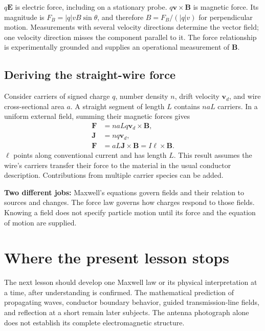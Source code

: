 \documentclass[11pt,letterpaper]{article}
\newcommand{\vect}[1]{\boldsymbol{#1}}
\newcommand{\idea}[1]{\par\smallskip\noindent\colorbox{pale}{\parbox{\dimexpr\linewidth-2\fboxsep\relax}{#1}}\par\smallskip}
\begin{document}
$q\vect E$ is electric force, including on a stationary probe. $q\vect v\times\vect B$ is magnetic force. Its magnitude is $F_B=|q|vB\sin\theta$, and therefore $B=F_B/(|q|v)$ for perpendicular motion. Measurements with several velocity directions determine the vector field; one velocity direction misses the component parallel to it. The force relationship is experimentally grounded and supplies an operational measurement of $\vect B$.

\subsection*{Deriving the straight-wire force}
Consider carriers of signed charge $q$, number density $n$, drift velocity $\vect v_d$, and wire cross-sectional area $a$. A straight segment of length $L$ contains $naL$ carriers. In a uniform external field, summing their magnetic forces gives
\begin{align}
\vect F&=naLq\vect v_d\times\vect B,\\
\vect J&=nq\vect v_d,\\
\vect F&=aL\vect J\times\vect B
=I\vect\ell\times\vect B.
\end{align}
$\vect\ell$ points along conventional current and has length $L$. This result assumes the wire's carriers transfer their force to the material in the usual conductor description. Contributions from multiple carrier species can be added.

\idea{\textbf{Two different jobs:} Maxwell's equations govern fields and their relation to sources and changes. The force law governs how charges respond to those fields. Knowing a field does not specify particle motion until its force and the equation of motion are supplied.}

\section*{Where the present lesson stops}
The next lesson should develop one Maxwell law or its physical interpretation at a time, after understanding is confirmed. The mathematical prediction of propagating waves, conductor boundary behavior, guided transmission-line fields, and reflection at a short remain later subjects. The antenna photograph alone does not establish its complete electromagnetic structure.

\newpage
\end{document}
